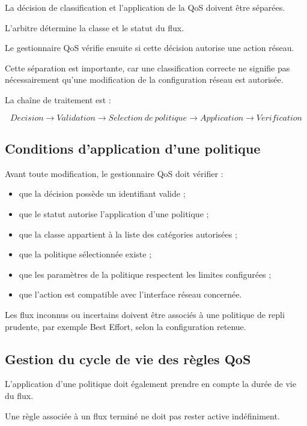La décision de classification et l'application de la QoS doivent être séparées.

L'arbitre détermine la classe et le statut du flux.

Le gestionnaire QoS vérifie ensuite si cette décision autorise une action réseau.

Cette séparation est importante, car une classification correcte ne signifie pas nécessairement qu'une modification de la configuration réseau est autorisée.

La chaîne de traitement est :

\[
Decision
\rightarrow
Validation
\rightarrow
Selection\ de\ politique
\rightarrow
Application
\rightarrow
Verification
\]

\subsection{Conditions d'application d'une politique}

Avant toute modification, le gestionnaire QoS doit vérifier :

\begin{itemize}
    \item que la décision possède un identifiant valide ;
    \item que le statut autorise l'application d'une politique ;
    \item que la classe appartient à la liste des catégories autorisées ;
    \item que la politique sélectionnée existe ;
    \item que les paramètres de la politique respectent les limites configurées ;
    \item que l'action est compatible avec l'interface réseau concernée.
\end{itemize}

Les flux inconnus ou incertains doivent être associés à une politique de repli prudente, par exemple Best Effort, selon la configuration retenue.

\subsection{Gestion du cycle de vie des règles QoS}

L'application d'une politique doit également prendre en compte la durée de vie du flux.

Une règle associée à un flux terminé ne doit pas rester active indéfiniment.

